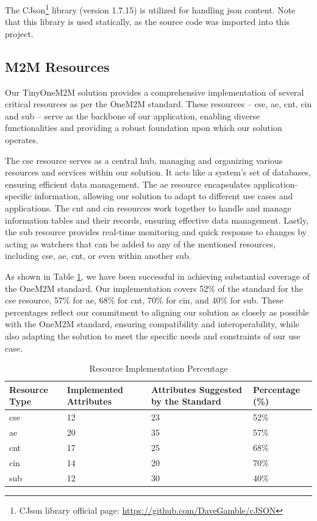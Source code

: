 \documentclass[a4paper,fleqn]{cas-dc}
\begin{document}
The CJson\footnote{CJson library official page: \url{https://github.com/DaveGamble/cJSON}} library (version 1.7.15) is utilized for handling \gls{json} content. Note that this library is used statically, as the source code was imported into this project.

\subsection{M2M Resources}\label{sec:m2mresources}

Our TinyOneM2M solution provides a comprehensive implementation of several critical resources as per the OneM2M standard. These resources -- \gls{cse}, \gls{ae}, \gls{cnt}, \gls{cin} and \gls{sub} -- serve as the backbone of our application, enabling diverse functionalities and providing a robust foundation upon which our solution operates.

The \gls{cse} resource serves as a central hub, managing and organizing various resources and services within our solution. It acts like a system's set of databases, ensuring efficient data management. The \gls{ae} resource encapsulates application-specific information, allowing our solution to adapt to different use cases and applications. The \gls{cnt} and \gls{cin} resources work together to handle and manage information tables and their records, ensuring effective data management. Lastly, the \gls{sub} resource provides real-time monitoring and quick response to changes by acting as watchers that can be added to any of the mentioned resources, including \gls{cse}, \gls{ae}, \gls{cnt}, or even within another \gls{sub}.

As shown in Table \ref{tab:resourceimplementationpercentage}, we have been successful in achieving substantial coverage of the OneM2M standard. Our implementation covers 52\% of the standard for the \gls{cse} resource, 57\% for \gls{ae}, 68\% for \gls{cnt}, 70\% for \gls{cin}, and 40\% for \gls{sub}. These percentages reflect our commitment to aligning our solution as closely as possible with the OneM2M standard, ensuring compatibility and interoperability, while also adapting the solution to meet the specific needs and constraints of our use case.

\begin{table}[h]
\scriptsize
\centering
\caption{Resource Implementation Percentage}
\label{tab:resourceimplementationpercentage}
\begin{tabular}{p{1.5cm}p{1.5cm}p{1.5cm}p{1.5cm}}
\hline
\textbf{Resource Type} & \textbf{Implemented Attributes} & \textbf{Attributes Suggested by the Standard} & \textbf{Percentage (\%)} \\
\hline \hline
\gls{cse} & 12 & 23 & 52\% \\
\gls{ae} & 20 & 35 & 57\% \\
\gls{cnt} & 17 & 25 & 68\% \\
\gls{cin} & 14 & 20 & 70\% \\
\gls{sub} & 12 & 30 & 40\% \\
\hline
\end{tabular}
\end{table}
\end{document}
